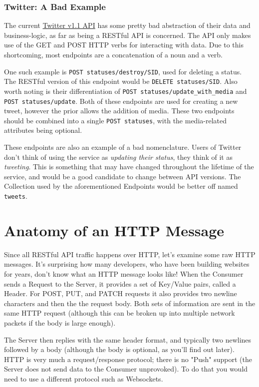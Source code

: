 \documentclass{book}
\begin{document}
\subsubsection{Twitter: A Bad Example}

The current \href{https://dev.twitter.com/docs/api/1.1}{Twitter v1.1 API} has some pretty bad abstraction of their data and business-logic, as far as being a RESTful API is concerned. The API only makes use of the GET and POST HTTP verbs for interacting with data. Due to this shortcoming, most endpoints are a concatenation of a noun and a verb.

One such example is \texttt{POST statuses/destroy/SID}, used for deleting a status. The RESTful version of this endpoint would be \texttt{DELETE statuses/SID}. Also worth noting is their differentiation of \texttt{POST statuses/update\_with\_media} and \texttt{POST statuses/update}. Both of these endpoints are used for creating a new tweet, however the prior allows the addition of media. These two endpoints should be combined into a single \texttt{POST statuses}, with the media-related attributes being optional.

These endpoints are also an example of a bad nomenclature. Users of Twitter don't think of using the service as \emph{updating their status}, they think of it as \emph{tweeting}. This is something that may have changed throughout the lifetime of the service, and would be a good candidate to change between API versions. The Collection used by the aforementioned Endpoints would be better off named \texttt{tweets}.


\section{Anatomy of an HTTP Message}

Since all RESTful API traffic happens over HTTP, let's examine some raw HTTP messages. It's surprising how many developers, who have been building websites for years, don't know what an HTTP message looks like! When the Consumer sends a Request to the Server, it provides a set of Key/Value pairs, called a Header. For POST, PUT, and PATCH requests it also provides two newline characters and then the the request body. Both sets of information are sent in the same HTTP request (although this can be broken up into multiple network packets if the body is large enough).

The Server then replies with the same header format, and typically two newlines followed by a body (although the body is optional, as you'll find out later). HTTP is very much a request/response protocol; there is no "Push" support (the Server does not send data to the Consumer unprovoked). To do that you would need to use a different protocol such as Websockets.
\end{document}
